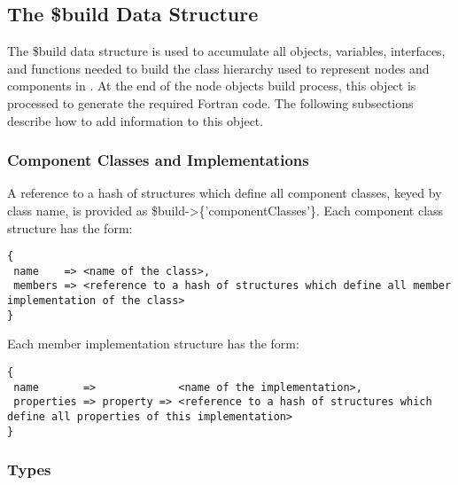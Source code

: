 \subsection{The {\normalfont \ttfamily \$build} Data Structure}

The {\normalfont \ttfamily \$build} data structure is used to accumulate all objects, variables, interfaces, and functions needed to build the class hierarchy used to represent nodes and components in \glc. At the end of the node objects build process, this object is processed to generate the required Fortran code. The following subsections describe how to add information to this object.

\subsubsection{Component Classes and Implementations}

A reference to a hash of structures which define all component classes, keyed by class name, is provided as {\normalfont \ttfamily \$build->\{'componentClasses'\}}. Each component class structure has the form:
\begin{verbatim}
{
 name    => <name of the class>,
 members => <reference to a hash of structures which define all member implementation of the class>
}
\end{verbatim}
Each member implementation structure has the form:
\begin{verbatim}
{
 name       =>             <name of the implementation>,
 properties => property => <reference to a hash of structures which define all properties of this implementation>
}
\end{verbatim}

\subsubsection{Types}\label{sec:buildHierarchyTypes}

